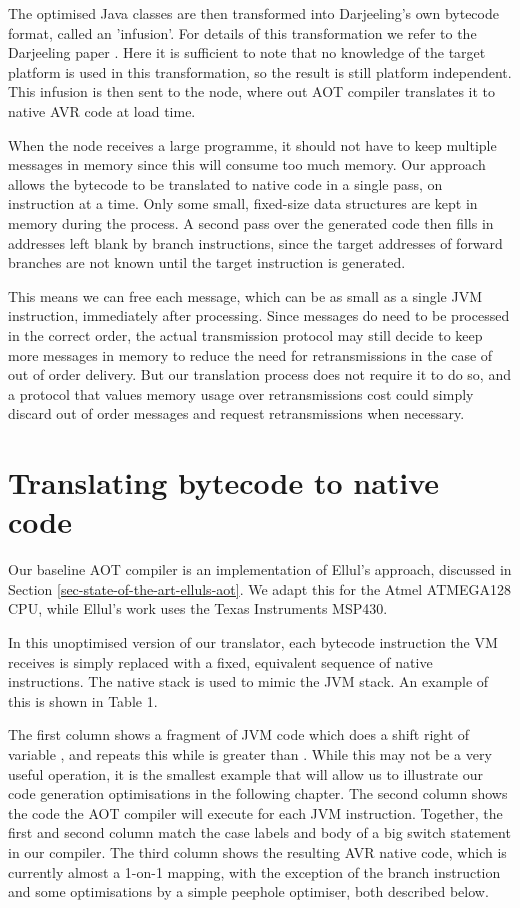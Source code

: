 The optimised Java classes are then transformed into Darjeeling's own bytecode format, called an 'infusion'. For details of this transformation we refer to the Darjeeling paper \cite{Brouwers:2009cj}. Here it is sufficient to note that no knowledge of the target platform is used in this transformation, so the result is still platform independent. This infusion is then sent to the node, where out AOT compiler translates it to native AVR code at load time.

When the node receives a large programme, it should not have to keep multiple messages in memory since this will consume too much memory. Our approach allows the bytecode to be translated to native code in a single pass, on instruction at a time. Only some small, fixed-size data structures are kept in memory during the process. A second pass over the generated code then fills in addresses left blank by branch instructions, since the target addresses of forward branches are not known until the target instruction is generated.

This means we can free each message, which can be as small as a single JVM instruction, immediately after processing. Since messages do need to be processed in the correct order, the actual transmission protocol may still decide to keep more messages in memory to reduce the need for retransmissions in the case of out of order delivery. But our translation process does not require it to do so, and a protocol that values memory usage over retransmissions cost could simply discard out of order messages and request retransmissions when necessary.


\section{Translating bytecode to native code}
\label{sec-basic-translation}
Our baseline AOT compiler is an implementation of Ellul's approach, discussed in Section \ref{sec-state-of-the-art-elluls-aot}. We adapt this for the Atmel ATMEGA128 CPU, while Ellul's work uses the Texas Instruments MSP430. 

In this unoptimised version of our translator, each bytecode instruction the VM receives is simply replaced with a fixed, equivalent sequence of native instructions. The native stack is used to mimic the JVM stack. An example of this is shown in Table 1.

The first column shows a fragment of JVM code which does a shift right of variable , and repeats this while  is greater than . While this may not be a very useful operation, it is the smallest example that will allow us to illustrate our code generation optimisations in the following chapter. The second column shows the code the AOT compiler will execute for each JVM instruction. Together, the first and second column match the case labels and body of a big switch statement in our compiler. The third column shows the resulting AVR native code, which is currently almost a 1-on-1 mapping, with the exception of the branch instruction and some optimisations by a simple peephole optimiser, both described below.

